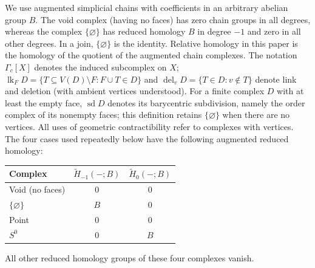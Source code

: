 \documentclass[11pt,a4paper]{article}
\theoremstyle{definition}
\newcommand{\sd}{\operatorname{sd}}
\newcommand{\lk}{\operatorname{lk}}
\newcommand{\del}{\operatorname{del}}
\newcommand{\Ht}{\widetilde H}
\newcommand{\G}{\Gamma}
\begin{document}
We use augmented simplicial chains with coefficients in an arbitrary abelian group $B$. The void complex (having no faces) has zero chain groups in all degrees, whereas the complex $\{\varnothing\}$ has reduced homology $B$ in degree $-1$ and zero in all other degrees. In a join, $\{\varnothing\}$ is the identity. Relative homology in this paper is the homology of the quotient of the augmented chain complexes. The notation $\G_c[X]$ denotes the induced subcomplex on $X$; $\lk_F D=\{T\subseteq V(D)\setminus F:F\cup T\in D\}$ and $\del_v D=\{T\in D:v\notin T\}$ denote link and deletion (with ambient vertices understood). For a finite complex $D$ with at least the empty face, $\sd D$ denotes its barycentric subdivision, namely the order complex of its nonempty faces; this definition retains $\{\varnothing\}$ when there are no vertices. All uses of geometric contractibility refer to complexes with vertices. The four cases used repeatedly below have the following augmented reduced homology:
\begin{center}
\begin{tabular}{@{}lcc@{}}
\toprule
Complex & $\Ht_{-1}(-;B)$ & $\Ht_0(-;B)$ \\
\midrule
Void (no faces) & $0$ & $0$ \\
$\{\varnothing\}$ & $B$ & $0$ \\
Point & $0$ & $0$ \\
$S^0$ & $0$ & $B$ \\
\bottomrule
\end{tabular}
\end{center}
All other reduced homology groups of these four complexes vanish.
\end{document}
